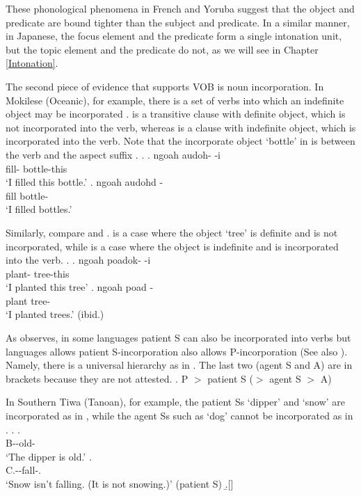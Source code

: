 These phonological phenomena in French and Yoruba suggest that
the object and predicate are bound tighter than the subject and predicate.
In a similar manner,
in Japanese,
the focus element and the predicate form a single intonation unit,
but the topic element and the predicate do not,
as we will see in Chapter \ref{Intonation}.

The second piece of evidence that supports VOB is noun incorporation.
In Mokilese (Oceanic), for example,
there is a set of verbs into which an indefinite object may be incorporated \cite[from][]{harrison76}.
\Next[a] is a transitive clause with definite object,
which is not incorporated into the verb,
whereas \Next[b] is a clause with indefinite object,
which is incorporated into the verb.
Note that the incorporate object  `bottle' in \Next[b] is between the verb and the aspect suffix .
%
\ex.
 \ag. ngoah audoh- -i \\
		 fill- bottle-this \\
		`I filled this bottle.'
 \bg. ngoah audohd - \\
		 fill bottle- \\
		`I filled bottles.'
		\hfill{\cite[162]{harrison76}}

Similarly,
compare \Next[a] and \Next[b].
\Next[a] is a case where the object  `tree' is definite and is not incorporated,
while \Next[b] is a case where the object is indefinite and is incorporated into the verb.
\ex.
 \ag. ngoah poadok- -i \\
 	 plant- tree-this \\
	`I planted this tree'
 \bg. ngoah poad - \\
 	 plant tree- \\
	`I planted trees.'
	\hfill{(ibid.)}

As  observes,
in some languages patient S can also be incorporated into verbs
but languages allows patient S-incorporation also allows P-incorporation (See also ).
Namely, there is a universal hierarchy as in \Next.
The last two (agent S and A) are in brackets because
they are not attested.
%
\ex. \label{NIhierarchy}P $>$ patient S ($>$ agent S $>$ A)

In Southern Tiwa (Tanoan), for example,
the patient Ss `dipper' and `snow' are incorporated as in \Next,
while the agent Ss such as `dog' cannot be incorporated as in \NNext.
	\ex. \ag.  \\
			{\sc B}--old- \\
			`The dipper is old.'
		\bg.  \\
			{\sc C}.--fall-. \\
			`Snow isn't falling. (It is not snowing.)'  \hfill{(patient S)}
		\b.[] \hfill{\cite{allenetal84,baker88}}
	
